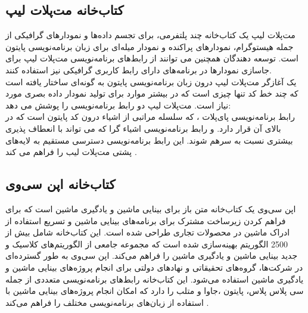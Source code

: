 \subsection[کتاب‌خانه مت‌پلات لیب]{کتاب‌خانه مت‌پلات لیپ }
مت‌پلات لیپ یک کتاب‌خانه چند پلتفرمی، برای تجسم داده‌ها و نمودارهای گرافیکی از جمله هیستوگرام، نمودارهای پراکنده و نمودار میله‌ای برای زبان برنامه‌نویسی
پایتون است. توسعه دهندگان همچنین می توانند از رابط‌های برنامه‌نویسی مت‌پلات لیپ برای جاسازی نمودارها در برنامه‌های دارای رابط کاربری گرافیکی نیز استفاده کنند.
\\
یک آغازگر
مت‌پلات لیپ  درون زبان برنامه‌نویسی پایتون به گونه‌ای ساختار یافته است که چند خط کد تنها چیزی است که در بیشتر موارد برای تولید نمودار داده بصری مورد نیاز است. مت‌پلات لیپ دو رابط برنامه‌نویسی را پوشش می دهد:
\\
رابط برنامه‌نویسی پای‌پلات ، که سلسله مراتبی از اشیاء درون کد پایتون است که در بالای آن  قرار دارد. و رابط برنامه‌نویسی اشیاء گرا که می تواند 
با انعطاف پذیری بیشتری نسبت به  سرهم شوند. این رابط برنامه‌نویسی دسترسی مستقیم به لایه‌های پشتی مت‌پلات لیب
را فراهم می کند \cite{Introduc75:online}.

\subsection{کتاب‌خانه اپن سی‌وی}
اپن سی‌وی یک کتاب‌خانه متن باز برای بینایی ماشین و یادگیری ماشین است که برای فراهم کردن زیرساخت مشترک برای برنامه‌های بینایی ماشین و تسریع استفاده از ادراک ماشین در محصولات
تجاری طراحی شده است. این کتاب‌خانه شامل بیش از 2500 الگوریتم بهینه‌سازی شده است که مجموعه جامعی از الگوریتم‌های کلاسیک و جدید بینایی ماشین و یادگیری ماشین 
را فراهم می‌کند. اپن سی‌وی به طور گسترده‌ای در شرکت‌ها، گروه‌های تحقیقاتی و نهادهای دولتی برای انجام پروژه‌های بینایی ماشین و یادگیری ماشین استفاده می‌شود. این کتاب‌خانه رابط‌های برنامه‌نویسی 
متعددی از جمله 
سی پلاس پلاس، پایتون ،جاوا و متلب را دارد که امکان انجام پروژه‌های بینایی ماشین با استفاده از زبان‌های برنامه‌نویسی مختلف را فراهم می‌کند \cite{AboutOpe4:online}.

